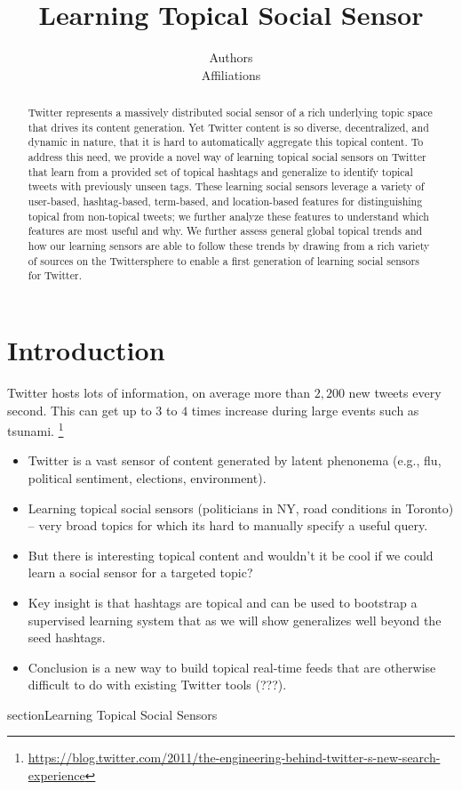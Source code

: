 \documentclass[letterpaper]{article}
\begin{document}
%
\title{Learning Topical Social Sensor}
\author{Authors\\
Affiliations
}
\maketitle
\begin{abstract}
Twitter represents a massively distributed social sensor of a rich underlying topic space that drives its content generation.  Yet Twitter content is so diverse, decentralized, and dynamic in nature, that it is hard to automatically aggregate this topical content.  To address this need, we provide a novel way of learning topical social sensors on Twitter that learn from a provided set of topical hashtags and generalize to identify topical tweets with previously unseen tags.  These learning social sensors leverage a variety of user-based, hashtag-based, term-based, and location-based features for distinguishing topical from non-topical tweets; we further analyze these features to understand which features are most useful and why.  We further assess general global topical trends and how our learning sensors are able to follow these trends by drawing from a rich variety of sources on the Twittersphere to enable a first generation of learning social sensors for Twitter. 
\end{abstract}

\section{Introduction}
Twitter hosts lots of information, on average more than $2,200$ new tweets every second. This can get up to $3$ to $4$ times increase during large events such as tsunami. \footnote{\hyperref[]{https://blog.twitter.com/2011/the-engineering-behind-twitter-s-new-search-experience}}
\begin{itemize}
\item Twitter is a vast sensor of content generated by latent phenonema (e.g., flu, political sentiment, elections, environment).
\item Learning topical social sensors (politicians in NY, road conditions in Toronto) -- very broad topics for which its hard to manually specify a useful query.
\item But there is interesting topical content and wouldn't it be cool if we could learn a social sensor for a targeted topic?
\item Key insight is that hashtags are topical and can be used to bootstrap a supervised learning system that as we will show generalizes well beyond the seed hashtags.
\item Conclusion is a new way to build topical real-time feeds that are otherwise difficult to do with existing Twitter tools (???).
\end{itemize}
section{Learning Topical Social Sensors}
\end{document}
